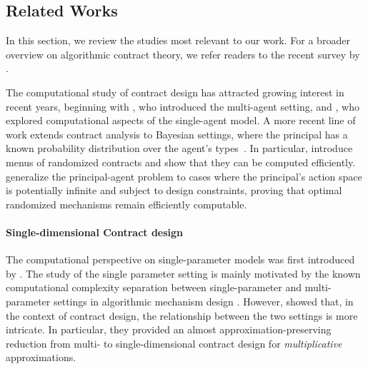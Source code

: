 \subsection{Related Works}

In this section, we review the studies most relevant to our work. For a broader overview on algorithmic contract theory, we refer readers to the recent survey by \citet{dutting2024algorithmic}. 

The computational study of contract design has attracted growing interest in recent years, beginning with \citet{babaioff2006combinatorial}, who introduced the multi-agent setting, and \citet{dutting2021complexity}, who explored computational aspects of the single-agent model. %
%
A more recent line of work extends contract analysis to Bayesian settings, where the principal has a known probability distribution over the agent’s types~\citep{guruganesh2021contracts, castiglioni2021bayesian, alon2021contracts, alon2023bayesian}. In particular, \citet{castiglioni2023designing} introduce menus of randomized contracts and show that they can be computed efficiently. \citet{gan2022optimal} generalize the principal-agent problem to cases where the principal’s action space is potentially infinite and subject to design constraints, proving that optimal randomized mechanisms remain efficiently computable.  



\paragraph{Single-dimensional Contract design}
The computational perspective on single-parameter models was first introduced by \citet{alon2021contracts,alon2023bayesian}.
%
The study of the single parameter setting is mainly motivated by the known computational complexity separation between single-parameter and multi-parameter settings in algorithmic mechanism design \cite{nisan1999algorithmic,daskalakis2015multi}. However, \citet{castiglioni2025reduction} showed that, in the context of contract design, the relationship between the two settings is more intricate. In particular, they provided an almost approximation-preserving reduction from multi- to single-dimensional contract design for \emph{multiplicative} approximations.


